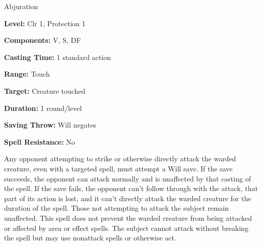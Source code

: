 
Abjuration

\textbf{Level:} Clr 1, Protection 1

\textbf{Components:} V, S, DF

\textbf{Casting Time:} 1 standard action

\textbf{Range:} Touch

\textbf{Target:} Creature touched

\textbf{Duration:} 1 round/level

\textbf{Saving Throw:} Will negates

\textbf{Spell Resistance:} No

Any opponent attempting to strike or otherwise directly attack the warded creature, 
even with a targeted spell, must attempt a Will save. If the save succeeds, the 
opponent can attack normally and is unaffected by that casting of the spell. If 
the save fails, the opponent can't follow through with the attack, that part of 
its action is lost, and it can't directly attack the warded creature for the duration 
of the spell. Those not attempting to attack the subject remain unaffected. This 
spell does not prevent the warded creature from being attacked or affected by area 
or effect spells. The subject cannot attack without breaking the spell but may 
use nonattack spells or otherwise act.

